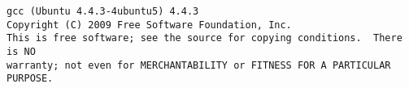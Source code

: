 \begin{lstlisting}
gcc (Ubuntu 4.4.3-4ubuntu5) 4.4.3
Copyright (C) 2009 Free Software Foundation, Inc.
This is free software; see the source for copying conditions.  There is NO
warranty; not even for MERCHANTABILITY or FITNESS FOR A PARTICULAR PURPOSE.
\end{lstlisting}